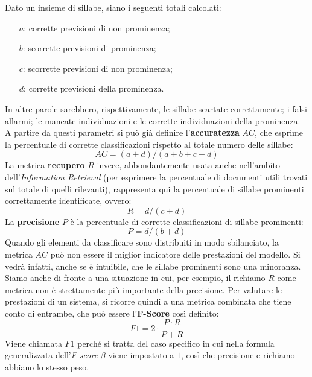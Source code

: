 \documentclass[twoside,twocolumn,10pt]{extarticle}
\theoremstyle{definition}
\begin{document}
		Dato un insieme di sillabe, siano i seguenti totali calcolati:
		\begin{itemize}
			\item[$a$:] corrette previsioni di non prominenza;
			\item[$b$:] scorrette previsioni di prominenza;
			\item[$c$:] scorrette previsioni di non prominenza;
			\item[$d$:] corrette previsioni della prominenza.
		\end{itemize}
		In altre parole sarebbero, rispettivamente, le sillabe scartate correttamente; i falsi allarmi; le mancate individuazioni e le corrette individuazioni della prominenza. A partire da questi parametri si può già definire l'\textbf{accuratezza} $AC$, che esprime la percentuale di corrette classificazioni rispetto al totale numero delle sillabe:
		\begin{equation}\label{eq:ac}
			AC = (a + d) / (a + b + c + d)
		\end{equation}
		La metrica \textbf{recupero} $R$ invece, abbondantemente usata anche nell'ambito dell'\textit{Information Retrieval} (per esprimere la percentuale di documenti utili trovati sul totale di quelli rilevanti), rappresenta qui la percentuale di sillabe prominenti correttamente identificate, ovvero:
		\begin{equation}\label{eq:r}
			R = d / (c + d)
		\end{equation}
		La \textbf{precisione} $P$ è la percentuale di corrette classificazioni di sillabe prominenti:
		\begin{equation}\label{eq:p}
			P = d / (b + d)
		\end{equation}
		Quando gli elementi da classificare sono distribuiti in modo sbilanciato, la metrica $AC$ può non essere il miglior indicatore delle prestazioni del modello. Si vedrà infatti, anche se è intuibile, che le sillabe prominenti sono una minoranza. Siamo anche di fronte a una situazione in cui, per esempio, il richiamo $R$ come metrica non è strettamente più importante della precisione. Per valutare le prestazioni di un sistema, si ricorre quindi a una metrica combinata che tiene conto di entrambe, che può essere l'\textbf{F-Score} così definito:
		\begin{equation}\label{eq:f}
			F1 = 2 \cdot \frac{P \cdot R}{P + R}
		\end{equation}
		Viene chiamata $F1$ perché si tratta del caso specifico in cui nella formula generalizzata dell'\textit{F-score} $\beta$ viene impostato a $1$, così che precisione e richiamo abbiano lo stesso peso.
	
\end{document}
